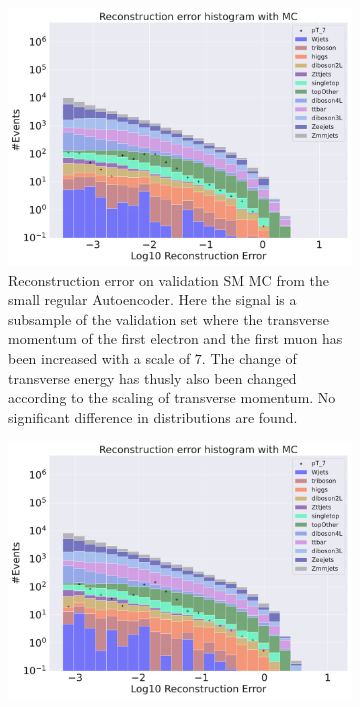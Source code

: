 \begin{figure}[h!]
    \centering
    \begin{subfigure}{.45\textwidth}
        \includegraphics[width=\textwidth]{Figures/AE_testing/small/b_data_recon_big_rm3_feats_sig_pT_7.pdf}
        \caption{Reconstruction error on validation SM MC from the small regular Autoencoder. Here the signal is a subsample of the validation 
        set where the transverse momentum of the first electron and the first muon has been increased with a scale of $7$. The change of transverse 
        energy has thusly also been changed according to the scaling of transverse momentum. No significant difference in distributions are found. }
        \label{fig:ae_small_pt_7}
    \end{subfigure}
    \hfill 
    \begin{subfigure}{.45\textwidth}
        \includegraphics[width=\textwidth]{Figures/AE_testing/big/b_data_recon_big_rm3_feats_sig_pT_7.pdf}

\end{subfigure}
\end{figure}
